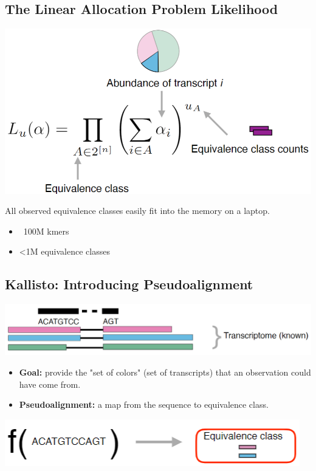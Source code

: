 \documentclass[10pt]{article}
\begin{document}
\subsection*{The Linear Allocation Problem Likelihood}
\begin{center}
    \includegraphics*[scale=0.75]{W4_3.png}
\end{center}
All observed equivalence classes easily fit into the memory on a laptop.
\begin{itemize}
    \item ~100M kmers
    \item <1M equivalence classes
\end{itemize}

\subsection*{Kallisto: Introducing Pseudoalignment}
\begin{center}
    \includegraphics*[scale=0.8]{W4_4.png}
\end{center}
\begin{itemize}
    \item \textbf{Goal:} provide the "set of colors" (set of transcripts) that an observation could have come from.
    \item \textbf{Pseudoalignment: } a map from the sequence to equivalence class.
\end{itemize}
\begin{center}
    \includegraphics*[scale=1]{W4_5.png}
\end{center}
\end{document}
